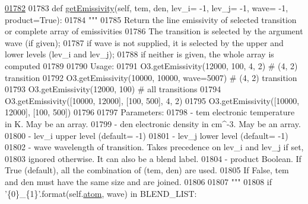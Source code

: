 \begin{DoxyCode}
\hypertarget{classpyneb_1_1core_1_1pynebcore_1_1_atom_l01782}{}\hyperlink{classpyneb_1_1core_1_1pynebcore_1_1_atom_aaf4e84a9d5f835e6284bd9302314f775}{01782} 
01783     \textcolor{keyword}{def }\hyperlink{classpyneb_1_1core_1_1pynebcore_1_1_atom_aaf4e84a9d5f835e6284bd9302314f775}{getEmissivity}(self, tem, den, lev\_i= -1, lev\_j= -1, wave= -1, product=True):
01784         \textcolor{stringliteral}{"""}
01785 \textcolor{stringliteral}{        Return the line emissivity of selected transition or complete array of emissivities}
01786 \textcolor{stringliteral}{        The transition is selected by the argument wave (if given); }
01787 \textcolor{stringliteral}{        if wave is not supplied, it is selected by the upper and lower levels (lev\_i and lev\_j); }
01788 \textcolor{stringliteral}{        if neither is given, the whole array is computed}
01789 \textcolor{stringliteral}{        }
01790 \textcolor{stringliteral}{        Usage:      }
01791 \textcolor{stringliteral}{            O3.getEmissivity(12000, 100, 4, 2)         # (4, 2) transition}
01792 \textcolor{stringliteral}{            O3.getEmissivity(10000, 10000, wave=5007)  # (4, 2) transition}
01793 \textcolor{stringliteral}{            O3.getEmissivity(12000, 100)               # all transitions}
01794 \textcolor{stringliteral}{            O3.getEmissivity([10000, 12000], [100, 500], 4, 2)}
01795 \textcolor{stringliteral}{            O3.getEmissivity([10000, 12000], [100, 500])}
01796 \textcolor{stringliteral}{            }
01797 \textcolor{stringliteral}{        Parameters:}
01798 \textcolor{stringliteral}{            - tem      electronic temperature in K. May be an array.}
01799 \textcolor{stringliteral}{            - den      electronic density in cm^-3. May be an array.}
01800 \textcolor{stringliteral}{            - lev\_i    upper level (default= -1)}
01801 \textcolor{stringliteral}{            - lev\_j    lower level (default= -1)}
01802 \textcolor{stringliteral}{            - wave     wavelength of transition. Takes precedence on lev\_i and lev\_j if set, }
01803 \textcolor{stringliteral}{                        ignored otherwise. It can also be a blend label.}
01804 \textcolor{stringliteral}{            - product  Boolean. If True (default), all the combination of (tem, den) are used. }
01805 \textcolor{stringliteral}{                         If False, tem and den must have the same size and are joined.}
01806 \textcolor{stringliteral}{}
01807 \textcolor{stringliteral}{        """}
01808         \textcolor{keywordflow}{if} \textcolor{stringliteral}{'\{0\}\_\{1\}'}.format(self.\hyperlink{classpyneb_1_1core_1_1pynebcore_1_1_atom_a192f3e20446d7fba81d789bc705d6c71}{atom}, wave) \textcolor{keywordflow}{in} BLEND\_LIST:

\end{DoxyCode}
